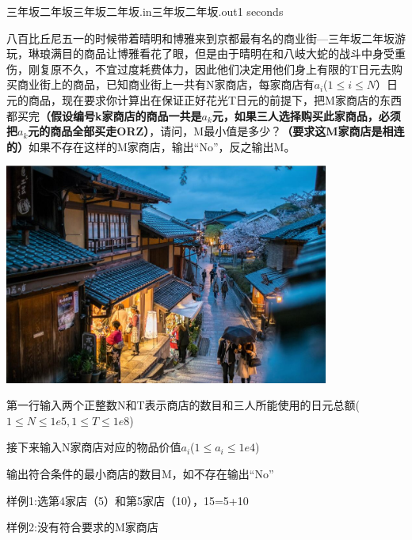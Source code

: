 \begin{problem}{三年坂二年坂}{三年坂二年坂.in}{三年坂二年坂.out}{1 seconds}

八百比丘尼五一的时候带着晴明和博雅来到京都最有名的商业街---三年坂二年坂游玩，琳琅满目的商品让博雅看花了眼，但是由于晴明在和八岐大蛇的战斗中身受重伤，刚复原不久，不宜过度耗费体力，因此他们决定用他们身上有限的T日元去购买商业街上的商品，已知商业街上一共有N家商店，每家商店有$a_{i}$($1 \leq i \leq N$）日元的商品，现在要求你计算出在保证正好花光T日元的前提下，把M家商店的东西都买完\textbf{（假设编号k家商店的商品一共是$a_{k}$元，如果三人选择购买此家商品，必须把$a_{k}$元的商品全部买走ORZ）}，请问，M最小值是多少？\textbf{（要求这M家商店是相连的）}如果不存在这样的M家商店，输出“No”，反之输出M。

\begin{center}
\includegraphics[width=0.8\textwidth]{pics/D.jpg}
\end{center}

\InputFile

第一行输入两个正整数N和T表示商店的数目和三人所能使用的日元总额($1 \leq N \leq 1e5,1 \leq T \leq 1e8$)
 
接下来输入N家商店对应的物品价值$a_{i}$($1 \leq a_{i} \leq 1e4$)

\OutputFile

输出符合条件的最小商店的数目M，如不存在输出“No”

\Example

\begin{example}
%
%
\end{example}

样例1:选第4家店（5）和第5家店（10），15=5+10

样例2:没有符合要求的M家商店

\end{problem}
